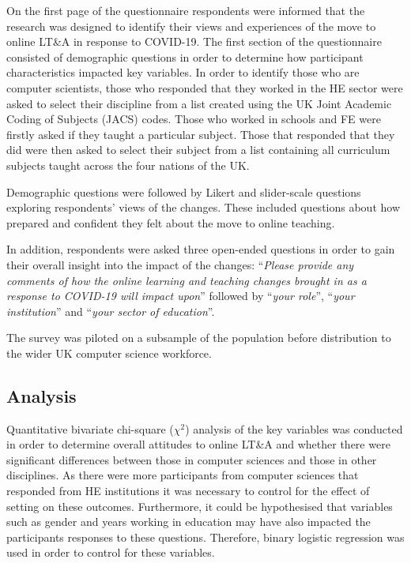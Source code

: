 \documentclass[sigconf]{acmart}
\begin{document}
On the first page of the questionnaire respondents were informed that
the research was designed to identify their views and experiences of
the move to online LT\&A in response to COVID-19. The first section of
the questionnaire consisted of demographic questions in order to
determine how participant characteristics impacted key variables. In
order to identify those who are computer scientists, those who
responded that they worked in the HE sector were asked to select their
discipline from a list created using the UK Joint Academic Coding of
Subjects (JACS) codes. Those who worked in schools and FE were firstly
asked if they taught a particular subject. Those that responded that
they did were then asked to select their subject from a list
containing all curriculum subjects taught across the four nations of
the UK.

Demographic questions were followed by Likert and slider-scale
questions exploring respondents' views of the changes. These included
questions about how prepared and confident they felt about the move to
online teaching.

In addition, respondents were asked three open-ended questions in
order to gain their overall insight into the impact of the changes:
``{\emph{Please provide any comments of how the online learning and
teaching changes brought in as a response to COVID-19 will impact
upon}}'' followed by ``{\emph{your role}}'', ``{\emph{your
institution}}'' and ``{\emph{your sector of education}}''.

The survey was piloted on a subsample of the population before
distribution to the wider UK computer science workforce.

\subsection{Analysis}

Quantitative bivariate chi-square ($\chi^2$) analysis of the key variables
was conducted in order to determine overall attitudes to online LT\&A
and whether there were significant differences between those in
computer sciences and those in other disciplines.  As there were more
participants from computer sciences that responded from HE
institutions it was necessary to control for the effect of setting on
these outcomes. Furthermore, it could be hypothesised that variables
such as gender and years working in education may have also impacted
the participants responses to these questions. Therefore, binary
logistic regression was used in order to control for these variables.
\end{document}
